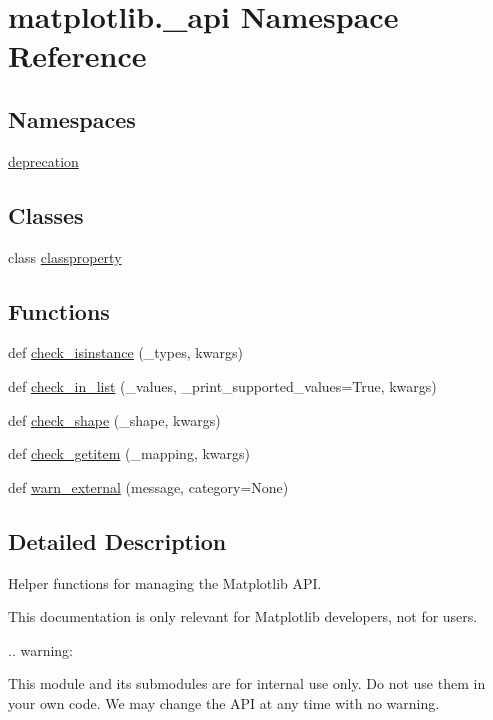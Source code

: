 \hypertarget{namespacematplotlib_1_1__api}{}\section{matplotlib.\+\_\+api Namespace Reference}
\label{namespacematplotlib_1_1__api}
\subsection*{Namespaces}
\begin{DoxyCompactItemize}
\item 
 \hyperlink{namespacematplotlib_1_1__api_1_1deprecation}{deprecation}
\end{DoxyCompactItemize}
\subsection*{Classes}
\begin{DoxyCompactItemize}
\item 
class \hyperlink{classmatplotlib_1_1__api_1_1classproperty}{classproperty}
\end{DoxyCompactItemize}
\subsection*{Functions}
\begin{DoxyCompactItemize}
\item 
def \hyperlink{namespacematplotlib_1_1__api_a56e2f2b8c5d54d2312723b8393149355}{check\+\_\+isinstance} (\+\_\+types, kwargs)
\item 
def \hyperlink{namespacematplotlib_1_1__api_a2164c58d6f07e67f7d7d486d53b24c47}{check\+\_\+in\+\_\+list} (\+\_\+values, \+\_\+print\+\_\+supported\+\_\+values=True, kwargs)
\item 
def \hyperlink{namespacematplotlib_1_1__api_aee2ab7522a67107f11c14ad87cdf19fc}{check\+\_\+shape} (\+\_\+shape, kwargs)
\item 
def \hyperlink{namespacematplotlib_1_1__api_af99f136fe109fdbc3c686232d820e987}{check\+\_\+getitem} (\+\_\+mapping, kwargs)
\item 
def \hyperlink{namespacematplotlib_1_1__api_ac668a8e9e8326aa746760038c8e264fa}{warn\+\_\+external} (message, category=None)
\end{DoxyCompactItemize}


\subsection{Detailed Description}
\begin{DoxyVerb}Helper functions for managing the Matplotlib API.

This documentation is only relevant for Matplotlib developers, not for users.

.. warning:

    This module and its submodules are for internal use only.  Do not use them
    in your own code.  We may change the API at any time with no warning.\end{DoxyVerb}
 

